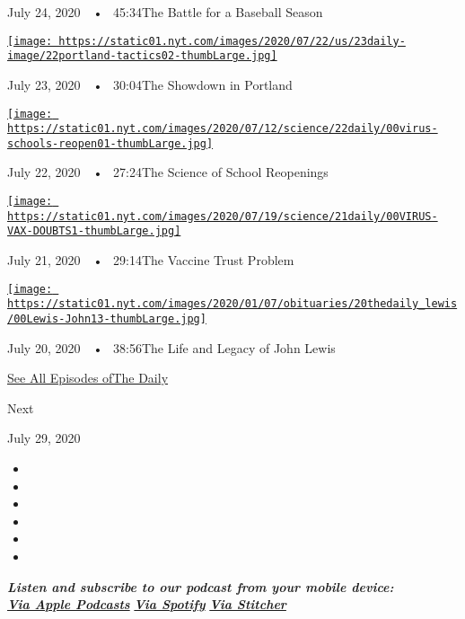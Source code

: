 July 24, 2020~~•~ 45:34The Battle for a Baseball Season

\href{https://www.nytimes.com/2020/07/23/podcasts/the-daily/portland-protests.html?action=click\&module=audio-series-bar\&region=header\&pgtype=Article}{\texttt{[image: https://static01.nyt.com/images/2020/07/22/us/23daily-image/22portland-tactics02-thumbLarge.jpg]}}

July 23, 2020~~•~ 30:04The Showdown in Portland

\href{https://www.nytimes.com/2020/07/22/podcasts/the-daily/school-reopenings-coronavirus.html?action=click\&module=audio-series-bar\&region=header\&pgtype=Article}{\texttt{[image: https://static01.nyt.com/images/2020/07/12/science/22daily/00virus-schools-reopen01-thumbLarge.jpg]}}

July 22, 2020~~•~ 27:24The Science of School Reopenings

\href{https://www.nytimes.com/2020/07/21/podcasts/the-daily/coronavirus-vaccine.html?action=click\&module=audio-series-bar\&region=header\&pgtype=Article}{\texttt{[image: https://static01.nyt.com/images/2020/07/19/science/21daily/00VIRUS-VAX-DOUBTS1-thumbLarge.jpg]}}

July 21, 2020~~•~ 29:14The Vaccine Trust Problem

\href{https://www.nytimes.com/2020/07/20/podcasts/the-daily/john-lewis.html?action=click\&module=audio-series-bar\&region=header\&pgtype=Article}{\texttt{[image: https://static01.nyt.com/images/2020/01/07/obituaries/20thedaily\_lewis/00Lewis-John13-thumbLarge.jpg]}}

July 20, 2020~~•~ 38:56The Life and Legacy of John Lewis

\href{https://www.nytimes.com/column/the-daily}{See All Episodes ofThe
Daily}

Next

July 29, 2020

\begin{itemize}
\item
\item
\item
\item
\item
\item
\end{itemize}

\emph{\textbf{Listen and subscribe to our podcast from your mobile
device:}}\\
\textbf{\href{https://itunes.apple.com/us/podcast/the-daily/id1200361736?mt=2}{\emph{Via
Apple Podcasts}}} \emph{\textbf{\textbar{}}}
\textbf{\href{https://open.spotify.com/show/3IM0lmZxpFAY7CwMuv9H4g?si=SfuMSC55R1qprFsRZU3_zw}{\emph{Via
Spotify}}} \emph{\textbf{\textbar{}}}
\textbf{\href{http://www.stitcher.com/podcast/the-new-york-times/the-daily-10}{\emph{Via
Stitcher}}}


